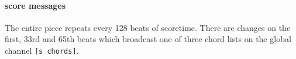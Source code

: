 \paragraph{score messages}
The entire piece repeats every 128 beats of scoretime. There are changes
on the first, 33rd and 65th beats which broadcast one of three chord 
lists on the global channel \verb+[s chords]+.
